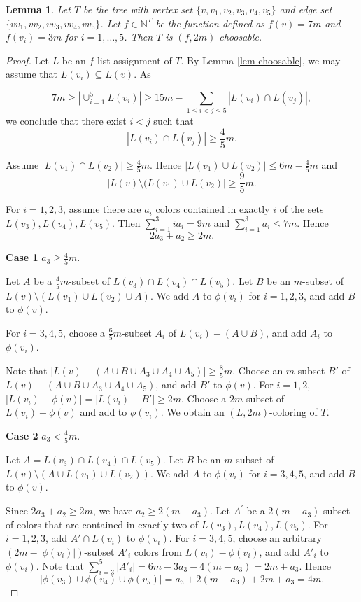 \documentclass{article}
\newtheorem{lemma}{Lemma}
\begin{document}
\begin{lemma}
\label{lem-star5}
    Let $T$ be the tree with vertex set $\{ v,v_1,v_2,v_3,v_4,v_5\}$ and edge set $\{ vv_1,vv_2,vv_3,vv_4,vv_5\}$. Let $f\in \mathbb{N}^T$ be the function defined as $f(v)=7m$ and $f(v_i)=3m$ for $i=1,\dots,5$. Then $T$ is $(f,2m)$-choosable.
\end{lemma}
\begin{proof}
    Let $L$ be an $f$-list assignment of $T$. By Lemma \ref{lem-choosable}, we may assume that $L(v_i) \subseteq L(v)$. 
    As 
      
        $$7m \ge |\cup_{i=1}^5 L(v_i)| \ge 15m - \sum_{1\le i< j \le 5}|L(v_i) \cap L(v_j)|,$$  we conclude that there exist $i< j$ such that 
        $$|L(v_i) \cap L(v_j)| \ge \frac 45 m.$$
       
    Assume $|L(v_1)\cap L(v_2)|\ge \frac45m$. Hence   $|L(v_1)\cup L(v_2)|\le 6m-\frac45m$ and $$|L(v)\setminus (L(v_1)\cup L(v_2)|\ge \frac95m.$$ 
    
    For $i=1,2,3$, assume there are $a_i$ colors contained in exactly $i$ of the sets  $ L(v_3),  L(v_4), L(v_5) $. Then  $\sum_{i=1}^3 ia_i =9m$ and $\sum_{i=1}^3 a_i \le 7m$.  Hence $$2a_3+a_2 \ge 2m.$$ 
    
   \noindent
{\bf Case 1} $a_3 \ge \frac{4}{5}m$.

Let $A$ be a  $\frac 45 m$-subset of   $L(v_3)\cap L(v_4)\cap L(v_5)$. Let $B$ be an $m$-subset of $L(v)\setminus (L(v_1)\cup L(v_2)\cup A)$.
      We add $A$ to $\phi(v_i)$ for $i=1,2,3$, and add $B$ to $\phi(v)$. 

   For $i=3,4,5$, choose a  $\frac{6}{5}m$-subset $A_i$ of $L(v_i)-(A \cup B)$, and add $A_i$ to $\phi(v_i)$.
   
   Note that $|L(v) - (A \cup B \cup A_3 \cup A_4 \cup A_5)| \ge \frac 85 m $. Choose an $m$-subset $B'$ of $L(v) - (A \cup B \cup A_3 \cup A_4 \cup A_5)$, and add $B' $ to $\phi(v)$. For $i=1,2$, $|L(v_i) - \phi(v)| = |L(v_i)-B'| \ge 2m$. Choose a $2m$-subset of $L(v_i) - \phi(v)$ and add to $\phi(v_i)$. We obtain an $(L, 2m)$-coloring of $T$. 
   
    \noindent
{\bf Case 2}  $a_3 < \frac 45 m$.

Let $A = L(v_3) \cap L(v_4) \cap L(v_5)$.   Let $B$ be an $m$-subset of $L(v)\setminus (A\cup L(v_1) \cup L(v_2))$. We add $A$ to $\phi(v_i)$ for $i=3,4,5$, and add $B$ to $\phi(v)$. 
    
     
    
    Since $2a_3+a_2 \ge 2m$, we have  $a_2 \ge 2(m-a_3)$.  Let $A^{\prime}$ be a $2(m-a_3)$-subset of colors that are contained in exactly two of $L(v_3),L(v_4), L(v_5)$. For $i=1,2,3$, add
    $A' \cap L(v_i)$ to $\phi(v_i)$. For $i=3,4,5$, choose an    
    arbitrary $(2m-|\phi(v_i)|)$-subset $A'_i$  colors from $L(v_i) - \phi(v_i)$, and add $A'_i$  to $\phi(v_i)$. 
    Note that $\sum_{i=3}^5 |A'_i| = 6m- 3a_3 - 4(m-a_3)=2m +a_3$. Hence $$|\phi(v_3) \cup \phi(v_4) \cup \phi(v_5)| = a_3 + 2(m-a_3)+ 2m +a_3 = 4m.$$
    

\end{proof}
\end{document}
